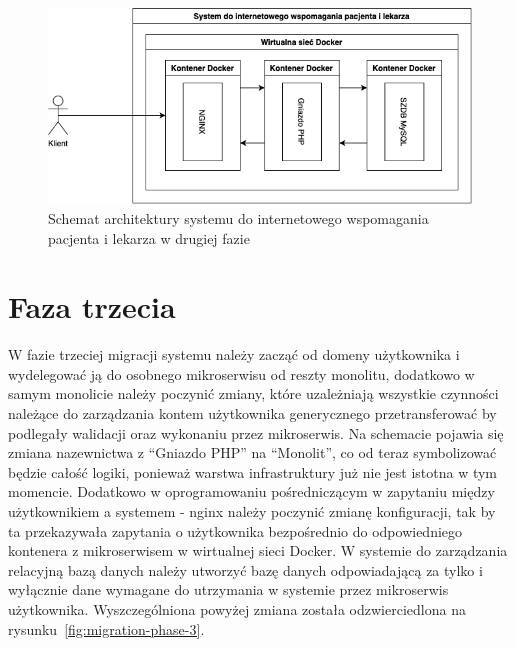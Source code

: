 \documentclass[12pt,twoside]{book}
\newcommand{\captionvspace}{\vspace{6pt}}
\begin{document}
    \begin{figure}[ht]
        \centering
        \includegraphics[width=\textwidth]{includes/images/migration-phase-2.png}
        \captionvspace
        \caption{Schemat architektury systemu do internetowego wspomagania pacjenta i lekarza w drugiej fazie}
        \label{fig:migration-phase-2}
    \end{figure}


    \section{Faza trzecia}
    W fazie trzeciej migracji systemu należy zacząć od domeny użytkownika i wydelegować ją do osobnego mikroserwisu od reszty monolitu, dodatkowo w samym monolicie należy poczynić zmiany, które uzależniają wszystkie czynności należące do zarządzania kontem użytkownika generycznego przetransferować by podlegały walidacji oraz wykonaniu przez mikroserwis. Na schemacie pojawia się zmiana nazewnictwa z “Gniazdo PHP” na “Monolit”, co od teraz symbolizować będzie całość logiki, ponieważ warstwa infrastruktury już nie jest istotna w tym momencie. Dodatkowo w oprogramowaniu pośredniczącym w zapytaniu między użytkownikiem a systemem - nginx należy poczynić zmianę konfiguracji, tak by ta przekazywała zapytania o użytkownika bezpośrednio do odpowiedniego kontenera z mikroserwisem w wirtualnej sieci Docker. W systemie do zarządzania relacyjną bazą danych należy utworzyć bazę danych odpowiadającą za tylko i wyłącznie dane wymagane do utrzymania w systemie przez mikroserwis użytkownika. Wyszczególniona powyżej zmiana została odzwierciedlona na rysunku~\ref{fig:migration-phase-3}.
\end{document}
